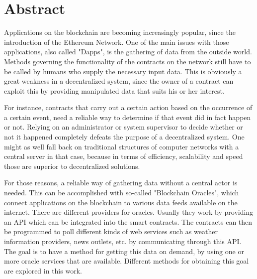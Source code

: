 \chapter{Abstract}


Applications on the blockchain are becoming increasingly popular, since the introduction of the Ethereum Network. One of the main issues with those applications, also called "Dapps", is the gathering of data from the outside world. Methods governing the functionality of the contracts on the network still have to be called by humans who supply the necessary input data. This is obviously a great weakness in a decentralized system, since the owner of a contract can exploit this by providing manipulated data that suits his or her interest.

For instance, contracts that carry out a certain action based on the occurrence of a certain event, need a reliable way to determine if that event did in fact happen or not. Relying on an administrator or system supervisor to decide whether or not it happened completely defeats the purpose of a decentralized system. One might as well fall back on traditional structures of computer networks with a central server in that case, because in terms of efficiency, scalability and speed those are superior to decentralized solutions.

For those reasons, a reliable way of gathering data without a central actor is needed. This can be accomplished with so-called "Blockchain Oracles", which connect applications on the blockchain to various data feeds available on the internet. There are different providers for oracles. Usually they work by providing an API which can be integrated into the smart contracts. The contracts can then be programmed to poll different kinds of web services such as weather information providers, news outlets, etc. by communicating through this API. The goal is to have a method for getting this data on demand, by using one or more oracle services that are available. Different methods for obtaining this goal are explored in this work. 
